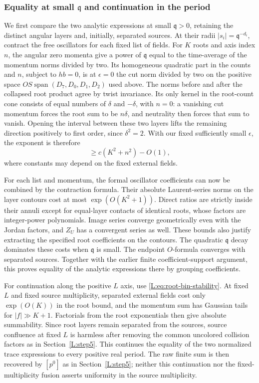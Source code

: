 \documentclass[11pt]{article}
\numberwithin{equation}{section}
\theoremstyle{definition}\newtheorem{definition}[theorem]{Definition}
\theoremstyle{remark}\newtheorem{remark}[theorem]{Remark}
\begin{document}
\subsubsection*{Equality at small $\mathfrak q$ and continuation in the period}

We first compare the two analytic expressions at small
$\mathfrak q>0$, retaining the distinct angular layers and, initially,
separated sources. At their radii $|s_i|=\mathfrak q^{-d_i}$, contract
the free oscillators for each fixed list of fields. For $K$ roots and
axis index $n$, the angular zero momenta give a power of $\mathfrak q$
equal to the time-average of the momentum norms divided by two. Its
homogeneous quadratic part in the counts and $n$, subject to $hb=0$,
is at $\epsilon=0$ the cut norm divided by two on the positive space
$OS\operatorname{span}(D_7,D_0,D_1,D_2)$ used above. The norms before
and after the collapsed root product agree by twist invariance. Its only
kernel in the root-count cone consists of equal numbers of $\delta$
and $-\delta$, with $n=0$: a vanishing cut momentum forces the root sum
to be $n\delta$, and neutrality then forces that sum to vanish.
Opening the interval between these two layers lifts the remaining
direction positively to first order, since $\delta^2=2$. With our fixed
sufficiently small $\epsilon$, the exponent is therefore
\[
 \ge c(K^2+n^2)-O(1),
\]
where constants may depend on the fixed external fields.

For each list and momentum, the formal oscillator coefficients can now
be combined by the contraction formula. Their absolute Laurent-series
norms on the layer contours cost at most $\exp(O(K^2+1))$. Direct ratios
are strictly inside their annuli except for equal-layer contacts of
identical roots, whose factors are integer-power polynomials. Image
series converge geometrically even with the Jordan factors, and $Z_U$
has a convergent series as well. These bounds also justify extracting
the specified root coefficients on the contours. The quadratic
$\mathfrak q$ decay dominates these costs when $\mathfrak q$ is small.
The endpoint $O$-formula converges with separated sources. Together with
the earlier finite coefficient-support argument, this proves equality
of the analytic expressions there by grouping coefficients.

For continuation along the positive $L$ axis, use
\eqref{L:eq:root-bin-stability}. At fixed $L$ and fixed source
multiplicity, separated external fields cost only $\exp(O(K))$ in the
root bound, and the momentum sum has Gaussian tails for
$|f|\gg K+1$. Factorials from the root exponentials then give absolute
summability. Since root layers remain separated from the sources,
source confluence at fixed $L$ is harmless after removing the common
uncolored collision factors as in Section~\ref{L:step5}. This continues the equality of the two normalized trace expressions
to every positive real period. The raw finite sum is then recovered by
$[p^0]$ as in Section~\ref{L:step5}; neither this continuation nor the
fixed-multiplicity fusion asserts uniformity in the source multiplicity.
\end{document}
